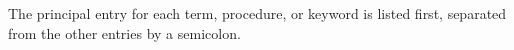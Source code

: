 \documentclass{algol60}
\begin{document}













\appendix






\renewcommand{\bibname}{References}


\begin{theindex}

The principal entry for each term, procedure, or keyword is listed
first, separated from the other entries by a semicolon.


\end{theindex}
\end{document}
